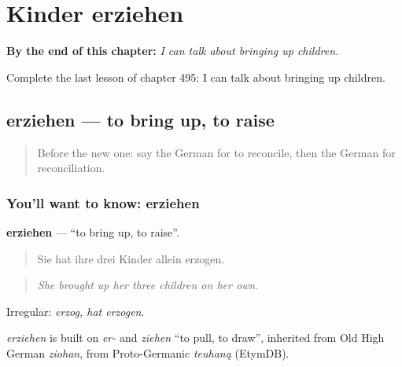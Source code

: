 
\chapter{Kinder erziehen}
\label{ch:ge-kinder-erziehen}

\begin{chapteropening}
\textbf{By the end of this chapter:} \emph{I can talk about bringing up children.}

Complete the last lesson of chapter 495: I can talk about bringing up children.
\end{chapteropening}

\section[erziehen]{erziehen — to bring up, to raise}

\label{lesson:GE-C495-erziehen}



\begin{quote}
Before the new one: say the German for to reconcile, then the German for reconciliation.
\end{quote}

\subsection*{You'll want to know: erziehen}
\textbf{erziehen} — \textquotedblleft{}to bring up, to raise\textquotedblright{}.

\begin{quote}
Sie hat ihre drei Kinder allein erzogen.
\end{quote}

\begin{quote}
\emph{She brought up her three children on her own.}
\end{quote}

Irregular: \emph{erzog, hat erzogen}.

\begin{cousinweb}
\emph{erziehen} is built on \emph{er-} and \emph{ziehen} \textquotedblleft{}to pull, to draw\textquotedblright{}, inherited from Old High German \emph{ziohan}, from Proto-Germanic \emph{teuhaną} (EtymDB).
\end{cousinweb}

